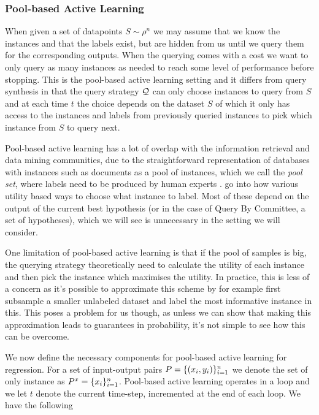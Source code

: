\subsubsection{Pool-based Active Learning}
When given a set of datapoints \(S \sim \rho^{n}\) we may assume that we know
the instances and that the labels exist, but are hidden from us until we query
them for the corresponding outputs. When the querying comes with a cost we want
to only query as many instances as needed to reach some level of performance
before stopping. This is the pool-based active learning setting \cite{lewis94}
and it differs from query synthesis in that the query strategy \(\mathcal{Q}\)
can only choose instances to query from \(S\) and at each time \(t\) the choice
depends on the dataset \(S\) of which it only has access to the instances and
labels from previously queried instances to pick which instance from \(S\) to
query next.

Pool-based active learning has a lot of overlap with the information retrieval
and data mining communities, due to the straightforward representation of
databases with instances such as documents as a pool of instances, which we call
the \textit{pool set}, where labels need to be produced by human experts
\cite{lewis94,tong01_suppor_vector_machin_activ_learn}. \cite{settles08} go into
how various utility based ways to choose what instance to label. Most of these
depend on the output of the current best hypothesis (or in the case of Query By
Committee, a set of hypotheses), which we will see is unnecessary in the setting
we will consider.

One limitation of pool-based active learning is that if the pool of samples is
big, the querying strategy theoretically need to calculate the utility of each
instance and then pick the instance which maximises the utility. In practice,
this is less of a concern as it's possible to approximate this scheme by for
example first subsample a smaller unlabeled dataset and label the most
informative instance in this. This poses a problem for us though, as unless we
can show that making this approximation leads to guarantees in probability, it's
not simple to see how this can be overcome.

We now define the necessary components for pool-based active learning for
regression. For a set of input-output pairs \(P = \{(x_{i},
y_{i})\}_{i=1}^{n}\) we denote the set of only instance as \(P^x =
\{x_{i}\}_{i=1}^{n}\). Pool-based active learning operates in a loop and we let
\(t\) denote the current time-step, incremented at the end of each loop. We have
the following

